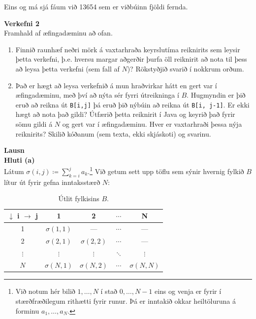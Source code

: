 \documentclass[12pt, a4paper, hidelinks]{article}
\begin{document}
\noindent
Eins og má sjá fáum við 13654 sem er viðbúinn fjöldi fernda.

\newpage
\noindent
\textbf{\large Verkefni 2} \medskip \\
Framhald af æfingadæminu að ofan.
\begin{enumerate}[label=(\alph*)]
    \item Finnið raunhæf neðri mörk á vaxtarhraða keyrslutíma reiknirits sem leysir þetta verkefni, þ.e. hversu margar
    aðgerðir þurfa öll reiknirit að nota til þess að leysa þetta verkefni (sem fall af $N$)? Rökstyðjið svarið í nokkrum
    orðum.

    \item Það er hægt að leysa verkefnið á mun hraðvirkar hátt en gert var í æfingadæminu, með því að nýta sér fyrri útreikninga
    í $B$. Hugmyndin er þið eruð að reikna út \texttt{B[i,j]} þá eruð þið nýbúin að reikna út \texttt{B[i, j-1]}. Er ekki hægt að
    nota það gildi? Útfærið þetta reiknirit í Java og keyrið það fyrir sömu gildi á $N$ og gert var í æfingadæminu. Hver er vaxtarhraði
    þessa nýja reiknirits? Skilið kóðanum (sem texta, ekki skjáskoti) og svarinu.
\end{enumerate}

\medskip
\noindent
\textbf{\large Lausn} \medskip \\
\textbf{Hluti (a)} \medskip \\
Látum $\sigma(i, j) \coloneqq \sum_{k = i}^j a_k$.\footnote{Við notum hér bilið $1, \ldots, N$ í stað $0, \ldots, N-1$
eins og venja er fyrir í stærðfræðilegum rithætti fyrir runur. Þá er inntakið okkar heiltöluruna á forminu $a_1, \ldots, a_N$.} Við getum sett upp töflu sem sýnir hvernig
fylkið $B$ lítur út fyrir gefna inntaksstærð $N$:

\renewcommand{\arraystretch}{1.25}
\begin{table}[ht!]
    \centering
    \begin{tabular}{ccccc}
        \toprule
        $\downarrow$ i $\rightarrow$ j &  1 & 2 & $\cdots$ & N \\
        \midrule
        1        & $\sigma(1, 1)$ &— & $\cdots$ & — \\
        2        & $\sigma(2, 1)$ &$\sigma(2, 2)$ & $\cdots$ & — \\
        $\vdots$ & $\vdots$ & $\vdots$ & $\ddots$ & $\vdots$ \\
        $N$ & $\sigma(N, 1)$ & $\sigma(N, 2)$ & $\cdots$ & $\sigma(N, N)$ \\ 
        \bottomrule
    \end{tabular}
    \caption{Útlit fylkisins $B$.}
\end{table}
\end{document}
